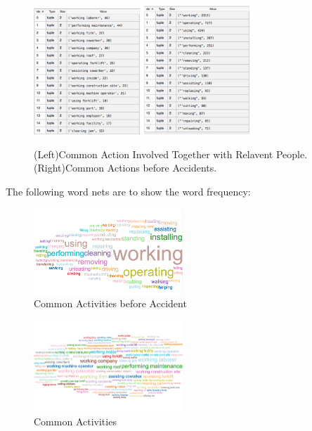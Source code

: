 \documentclass[DIV=calc, paper=a4, fontsize=11pt, twocolumn]{scrartcl}	 %
\begin{document}
\begin{figure}%
    \centering
    \includegraphics[width=4cm]{q41.png}
    \includegraphics[width=4cm]{q42.png}
    \caption{(Left)Common Action Involved Together with Relavent
      People. (Right)Common Actions before Accidents.}%
\end{figure}


The following word nets are to show the word frequency:

\begin{figure}[h!]
  \centering
      \includegraphics[width=0.5\textwidth]{bef_acc.png}
   \caption{Common Activities before Accident}
\end{figure}


\begin{figure}[h!]
  \centering
      \includegraphics[width=0.5\textwidth]{act.png}
   \caption{Common Activities}
\end{figure}
\end{document}
